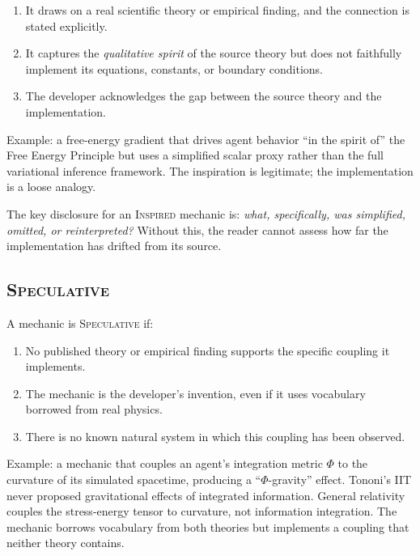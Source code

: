 \documentclass[12pt,a4paper]{article}
\begin{document}
\begin{enumerate}
  \item It draws on a real scientific theory or empirical
    finding, and the connection is stated explicitly.
  \item It captures the \emph{qualitative spirit} of the source
    theory but does not faithfully implement its equations,
    constants, or boundary conditions.
  \item The developer acknowledges the gap between the source
    theory and the implementation.
\end{enumerate}

Example: a free-energy gradient that drives agent behavior ``in
the spirit of'' the Free Energy Principle \citep{friston2010}
but uses a simplified scalar proxy rather than the full
variational inference framework.  The inspiration is legitimate;
the implementation is a loose analogy.

The key disclosure for an \textsc{Inspired} mechanic is:
\emph{what, specifically, was simplified, omitted, or
reinterpreted?}  Without this, the reader cannot assess how far
the implementation has drifted from its source.

\subsection{\textsc{Speculative}}

A mechanic is \textsc{Speculative} if:

\begin{enumerate}
  \item No published theory or empirical finding supports the
    specific coupling it implements.
  \item The mechanic is the developer's invention, even if it
    uses vocabulary borrowed from real physics.
  \item There is no known natural system in which this coupling
    has been observed.
\end{enumerate}

Example: a mechanic that couples an agent's integration metric
$\Phi$ to the curvature of its simulated spacetime, producing a
``$\Phi$-gravity'' effect.  Tononi's IIT
\citep{tononi2004} never proposed gravitational effects of
integrated information.  General relativity \citep{carroll2004}
couples the stress-energy tensor to curvature, not information
integration.  The mechanic borrows vocabulary from both theories
but implements a coupling that neither theory contains.
\end{document}
